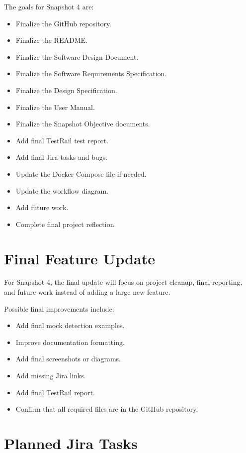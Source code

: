 \documentclass[12pt]{article}
\begin{document}
The goals for Snapshot 4 are:

\begin{itemize}
    \item Finalize the GitHub repository.
    \item Finalize the README.
    \item Finalize the Software Design Document.
    \item Finalize the Software Requirements Specification.
    \item Finalize the Design Specification.
    \item Finalize the User Manual.
    \item Finalize the Snapshot Objective documents.
    \item Add final TestRail test report.
    \item Add final Jira tasks and bugs.
    \item Update the Docker Compose file if needed.
    \item Update the workflow diagram.
    \item Add future work.
    \item Complete final project reflection.
\end{itemize}

\section{Final Feature Update}

For Snapshot 4, the final update will focus on project cleanup, final reporting, and future work instead of adding a large new feature.

Possible final improvements include:

\begin{itemize}
    \item Add final mock detection examples.
    \item Improve documentation formatting.
    \item Add final screenshots or diagrams.
    \item Add missing Jira links.
    \item Add final TestRail report.
    \item Confirm that all required files are in the GitHub repository.
\end{itemize}

\section{Planned Jira Tasks}
\end{document}
